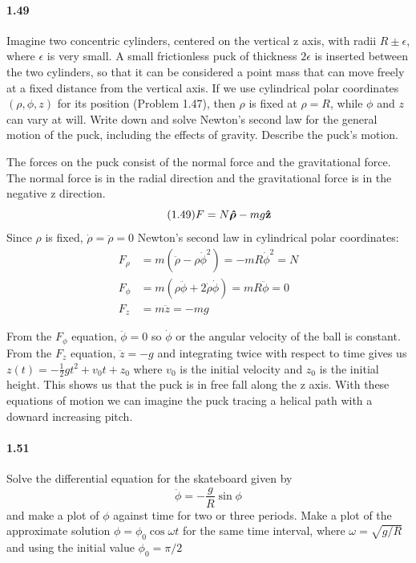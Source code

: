 \documentclass[../problems.tex]{subfiles}
\begin{document}
\newpage
\paragraph{1.49}
Imagine two concentric cylinders, centered on the vertical z axis, with radii $R\pm \epsilon$, where 
$\epsilon$ is very small. A small frictionless puck of thickness $2\epsilon$ is inserted between the 
two cylinders, so that it can be considered a point mass that can move freely at a fixed distance 
from the vertical axis. If we use cylindrical polar coordinates $(\rho, \phi, z)$ for its position 
(Problem 1.47), then $\rho$ is fixed at $\rho = R$, while $\phi$ and $z$ can vary at will. Write 
down and solve Newton's second law for the general motion of the puck, including the effects of 
gravity. Describe the puck's motion.
\barh

The forces on the puck consist of the normal force and the gravitational force. The normal force is 
in the radial direction and the gravitational force is in the negative z direction.
\begin{equation*} \tag{1.49} \label{eq1.49}
    F = N \vb*{\hat \rho} - mg \vb{\hat z}
\end{equation*}
Since $\rho$ is fixed, $\dot \rho = \ddot \rho = 0$ Newton's second law in cylindrical polar 
coordinates:
\begin{align*}
    F_\rho &= m (\ddot{\rho} - \rho \dot{\phi}^2) = -m R \dot{\phi}^2 = N \\
    F_\phi &= m (\rho \ddot{\phi} + 2 \dot{\rho} \dot{\phi}) = m R \ddot \phi = 0 \\
    F_z &= m \ddot{z} = -mg
\end{align*}

From the $F_\phi$ equation, $\ddot \phi = 0$ so $\dot \phi$ or the angular velocity of the ball is 
constant. From the $F_z$ equation, $\ddot z = -g$ and integrating twice with respect to time gives 
us $z(t) = -\frac{1}{2}gt^2 + v_0 t + z_0$ where $v_0$ is the initial velocity and $z_0$ is the 
initial height. This shows us that the puck is in free fall along the z axis. With these equations 
of motion we can imagine the puck tracing a helical path with a downard increasing pitch.

\paragraph{1.51}
Solve the differential equation for the skateboard given by 
\begin{equation*}
    \ddot \phi = -\frac{g}{R} \sin{\phi}
\end{equation*}
and make a plot of $\phi$ against time for two or three periods. Make a plot of the approximate 
solution $\phi = \phi_0 \cos{\omega t}$ for the same time interval, where $\omega = \sqrt{g/R}$ and
using the initial value $\phi_0 = \pi / 2$
\barh
\end{document}
